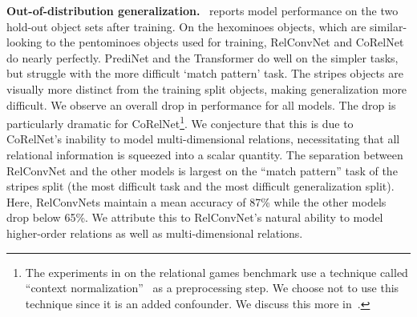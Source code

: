 \textbf{Out-of-distribution generalization.}~ reports model performance on the two hold-out object sets after training. On the hexominoes objects, which are similar-looking to the pentominoes objects used for training, RelConvNet and CoRelNet do nearly perfectly. PrediNet and the Transformer do well on the simpler tasks, but struggle with the more difficult `match pattern' task. The stripes objects are visually more distinct from the training split objects, making generalization more difficult. We observe an overall drop in performance for all models. The drop is particularly dramatic for CoRelNet\footnote{The experiments in \citep{kergNeuralArchitecture2022} on the relational games benchmark use a technique called ``context normalization''~\citep{webbLearningRepresentationsThat2020} as a preprocessing step. We choose not to use this technique since it is an added confounder. We discuss this more in~.}. We conjecture that this is due to CoRelNet's inability to model multi-dimensional relations, necessitating that all relational information is squeezed into a scalar quantity. The separation between RelConvNet and the other models is largest on the ``match pattern'' task of the stripes split (the most difficult task and the most difficult generalization split). Here, RelConvNets maintain a mean accuracy of 87\% while the other models drop below 65\%. We attribute this to RelConvNet's natural ability to model higher-order relations as well as multi-dimensional relations.
